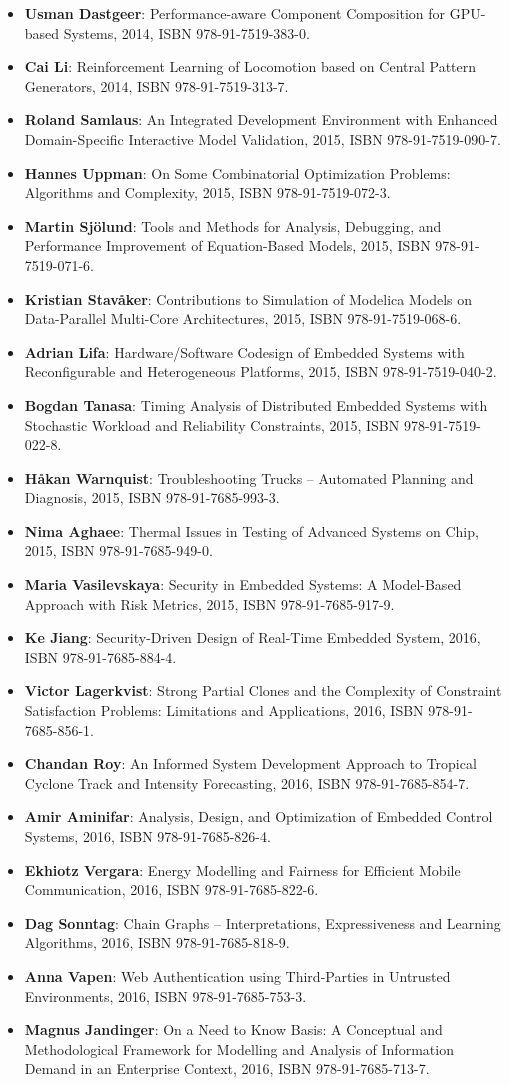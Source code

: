\documentclass[a4paper,showtrims,twocolumn]{memoir}
\newenvironment{theses}
  {
    \begin{itemize}
      \setlength{\itemsep}{0.2em}
      \setlength{\parskip}{0em}
      \setlength{\parsep}{0em}
  }
  {
    \end{itemize}
  }
\newcommand{\thesis}[5]{\item[No. #1] \textbf{#2}: #3, #4, ISBN #5.}
\begin{document}
\begin{theses}
    \thesis{1581}{Usman Dastgeer}{Performance-aware Component Composition for GPU-based Systems}{2014}{978-91-7519-383-0}
    \thesis{1602}{Cai Li}{Reinforcement Learning of Locomotion based on Central Pattern Generators}{2014}{978-91-7519-313-7}
    \thesis{1652}{Roland Samlaus}{An Integrated Development Environment with Enhanced Domain-Specific Interactive Model Validation}{2015}{978-91-7519-090-7}
    \thesis{1663}{Hannes Uppman}{On Some Combinatorial Optimization Problems: Algorithms and Complexity}{2015}{978-91-7519-072-3}
    \thesis{1664}{Martin Sjölund}{Tools and Methods for Analysis, Debugging, and Performance Improvement of Equation-Based Models}{2015}{978-91-7519-071-6}
    \thesis{1666}{Kristian Stavåker}{Contributions to Simulation of Modelica Models on Data-Parallel Multi-Core Architectures}{2015}{978-91-7519-068-6}
    \thesis{1680}{Adrian Lifa}{Hardware/Software Codesign of Embedded Systems with Reconfigurable and Heterogeneous Platforms}{2015}{978-91-7519-040-2}
    \thesis{1685}{Bogdan Tanasa}{Timing Analysis of Distributed Embedded Systems with Stochastic Workload and Reliability Constraints}{2015}{978-91-7519-022-8}
    \thesis{1691}{Håkan Warnquist}{Troubleshooting Trucks – Automated Planning and Diagnosis}{2015}{978-91-7685-993-3}
    \thesis{1702}{Nima Aghaee}{Thermal Issues in Testing of Advanced Systems on Chip}{2015}{978-91-7685-949-0}
    \thesis{1715}{Maria Vasilevskaya}{Security in Embedded Systems: A Model-Based Approach with Risk Metrics}{2015}{978-91-7685-917-9}
    \thesis{1729}{Ke Jiang}{Security-Driven Design of Real-Time Embedded System}{2016}{978-91-7685-884-4}
    \thesis{1733}{Victor Lagerkvist}{Strong Partial Clones and the Complexity of Constraint Satisfaction Problems: Limitations and Applications}{2016}{978-91-7685-856-1}
    \thesis{1734}{Chandan Roy}{An Informed System Development Approach to Tropical Cyclone Track and Intensity Forecasting}{2016}{978-91-7685-854-7}
    \thesis{1746}{Amir Aminifar}{Analysis, Design, and Optimization of Embedded Control Systems}{2016}{978-91-7685-826-4}
    \thesis{1747}{Ekhiotz Vergara}{Energy Modelling and Fairness for Efficient Mobile Communication}{2016}{978-91-7685-822-6}
    \thesis{1748}{Dag Sonntag}{Chain Graphs – Interpretations, Expressiveness and Learning Algorithms}{2016}{978-91-7685-818-9}
    \thesis{1768}{Anna Vapen}{Web Authentication using Third-Parties in Untrusted Environments}{2016}{978-91-7685-753-3}
    \thesis{1778}{Magnus Jandinger}{On a Need to Know Basis: A Conceptual and Methodological Framework for Modelling and Analysis of Information Demand in an Enterprise Context}{2016}{978-91-7685-713-7}

\end{theses}
\end{document}
